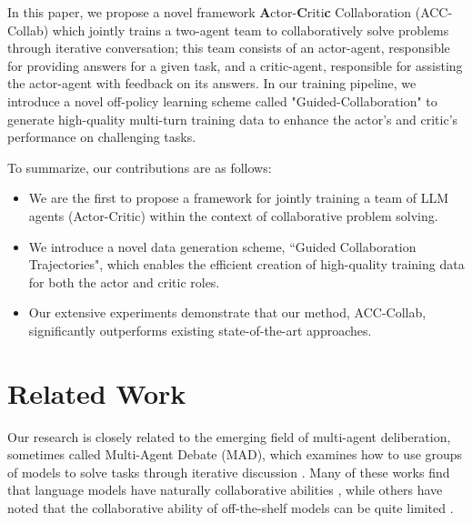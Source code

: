In this paper, we propose a novel framework \textbf{A}ctor-\textbf{C}riti\textbf{c} Collaboration (ACC-Collab) which jointly trains a two-agent team to collaboratively solve problems through iterative conversation; this team consists of an actor-agent, responsible for providing answers for a given task, and a critic-agent, responsible for assisting the actor-agent with feedback on its answers.
In our training pipeline, we introduce a novel off-policy learning scheme called "Guided-Collaboration" to generate high-quality multi-turn training data to enhance the actor's and critic's performance on challenging tasks.




To summarize, our contributions are as follows:
\begin{itemize}
    \item We are the first to propose a framework for jointly training a team of LLM agents (Actor-Critic) within the context of collaborative problem solving.
    \item We introduce a novel data generation scheme, ``Guided Collaboration Trajectories", which enables the efficient creation of high-quality training data for both the actor and critic roles.
    \item Our extensive experiments demonstrate that our method, ACC-Collab, significantly outperforms existing state-of-the-art approaches.
\end{itemize}















\section{Related Work}
Our research is closely related to the emerging field of multi-agent deliberation, sometimes called Multi-Agent Debate (MAD), which examines how to use groups of models to solve tasks through iterative discussion \cite{chan2023chateval,liang2023encouraging,du2023improving,li2023prd,khan2024debating,michael2023debate,rasal2024llm,pham2023let,abdelnabi2023llm,hong2023metagpt,irving2018ai,li2023theory,li2023metaagents,li2024more,wang2023can,zhang2023exploring}. 
Many of these works find that language models have naturally collaborative abilities \cite{singhal2023towards,du2023improving,chan2023chateval}, while others have noted that the collaborative ability of off-the-shelf models can be quite limited \cite{wang2024rethinking,smitshould}.

